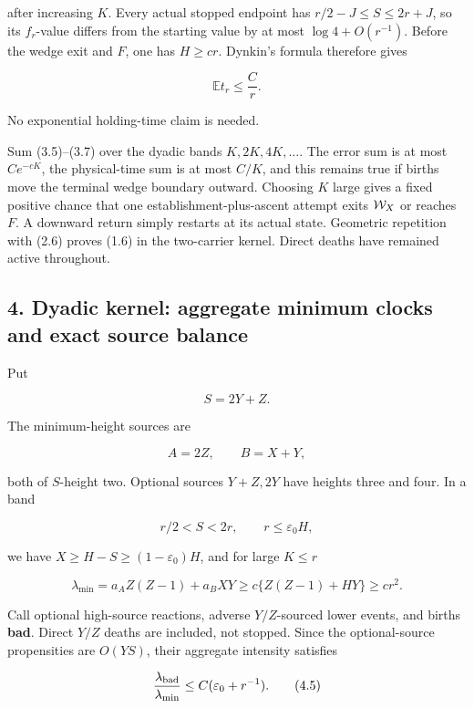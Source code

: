after increasing \(K\). Every actual stopped endpoint has
\(r/2-J\le S\le2r+J\), so its \(f_r\)-value differs from the starting
value by at most \(\log4+O(r^{-1})\). Before the wedge exit and \(F\),
one has \(H\ge cr\). Dynkin's formula therefore gives

\[
                              \mathbb E t_r\le \frac C r.             \tag{3.7}
\]

No exponential holding-time claim is needed.

Sum (3.5)--(3.7) over the dyadic bands \(K,2K,4K,\ldots\). The error sum
is at most \(Ce^{-cK}\), the physical-time sum is at most \(C/K\), and
this remains true if births move the terminal wedge boundary outward.
Choosing \(K\) large gives a fixed positive chance that one
establishment-plus-ascent attempt exits \({\cal W}_X\) or reaches \(F\).
A downward return simply restarts at its actual state. Geometric
repetition with (2.6) proves (1.6) in the two-carrier kernel. Direct
deaths have remained active throughout.

\subsection{4. Dyadic kernel: aggregate minimum clocks and exact source
balance}

Put

\[
                              S=2Y+Z.                  \tag{4.1}
\]

The minimum-height sources are

\[
                         A=2Z,\qquad B=X+Y,            \tag{4.2}
\]

both of \(S\)-height two. Optional sources \(Y+Z,2Y\) have heights three
and four. In a band

\[
                         r/2<S<2r,
 \qquad r\le\varepsilon_0H,                            \tag{4.3}
\]

we have \(X\ge H-S\ge(1-\varepsilon_0)H\), and for large \(K\le r\)

\[
 \lambda_{\min}=a_A Z(Z-1)+a_BXY
       \ge c\{Z(Z-1)+HY\}\ge cr^2.                   \tag{4.4}
\]

Call optional high-source reactions, adverse \(Y/Z\)-sourced lower
events, and births \textbf{bad}. Direct \(Y/Z\) deaths are included, not
stopped. Since the optional-source propensities are \(O(YS)\), their
aggregate intensity satisfies

\[
 \frac{\lambda_{\rm bad}}{\lambda_{\min}}
       \le C(\varepsilon_0+r^{-1}).                   \tag{4.5}
\]


